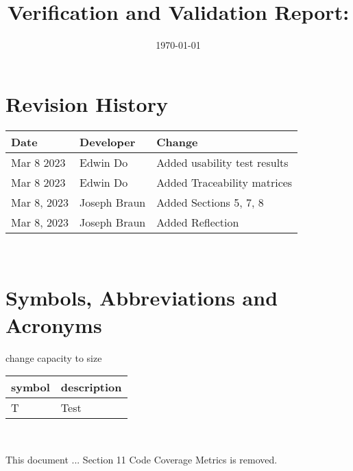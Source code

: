 \documentclass[12pt, titlepage]{article}
\begin{document}
\title{Verification and Validation Report: \progname} 
\author{\authname}
\date{\today}
	
\maketitle


\section{Revision History}


\begin{tabularx}{\textwidth}{p{3cm}p{3cm}X}
\toprule {\bf Date} & {\bf Developer} & {\bf Change}\\
\midrule
Mar 8 2023 & Edwin Do & Added usability test results \\
Mar 8 2023 & Edwin Do & Added Traceability matrices \\
Mar 8, 2023 & Joseph Braun & Added Sections 5, 7, 8 \\
Mar 8, 2023 & Joseph Braun & Added Reflection \\
\bottomrule
\end{tabularx}

~\newpage

\section{Symbols, Abbreviations and Acronyms}
change capacity to size

\renewcommand{\arraystretch}{1.2}
\begin{tabular}{l l} 
  \toprule		
  \textbf{symbol} & \textbf{description}\\
  \midrule 
  T & Test\\
  \bottomrule
\end{tabular}\\


\newpage

\tableofcontents

\listoftables %

\listoffigures %

\newpage


This document ...
Section 11 Code Coverage Metrics is removed.
\end{document}
